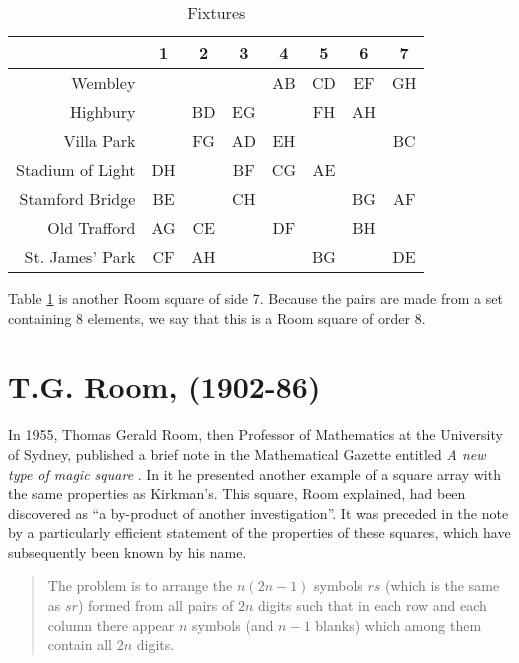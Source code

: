 \begin{table}[h!]
  \begin{center}
    \begin{tabular}{r|ccccccc}
                       & 1  &  2 &  3 &  4 &  5 &  6 &  7 \\ \hline
               Wembley &    &    &    & AB & CD & EF & GH \\
              Highbury &    & BD & EG &    & FH & AH &    \\
            Villa Park &    & FG & AD & EH &    &    & BC \\
      Stadium of Light & DH &    & BF & CG & AE &    &    \\
       Stamford Bridge & BE &    & CH &    &    & BG & AF \\
          Old Trafford & AG & CE &    & DF &    & BH &    \\
       St. James' Park & CF & AH &    &    & BG &    & DE
    \end{tabular}
  \end{center}
  \caption{Fixtures}
  \label{tab:fixtures}
\end{table}

Table \ref{tab:fixtures} is another Room square of side 7.
Because the pairs are made from a set containing 8 elements, we say that this is a Room square of order 8.

\section{T.G. Room, (1902-86)}

In 1955, Thomas Gerald Room, then Professor of Mathematics at the University of Sydney, published a brief note in the Mathematical Gazette entitled
\emph{A new type of magic square}
\cite{room2569NewType1955}.
In it he presented another example of a square array with the same properties as Kirkman’s.
This square, Room explained, had been discovered as ``a by-product of another investigation''.
It was preceded in the note by a particularly efficient statement of the properties of these squares, which have subsequently been known by his name.

\begin{quotation}
The problem is to arrange the $n(2n - 1)$ symbols $rs$ (which is the same as $sr$) formed from all pairs of $2n$ digits such that in each row and each column there appear $n$ symbols (and $n - 1$ blanks) which among them contain all $2n$ digits.
\end{quotation}

